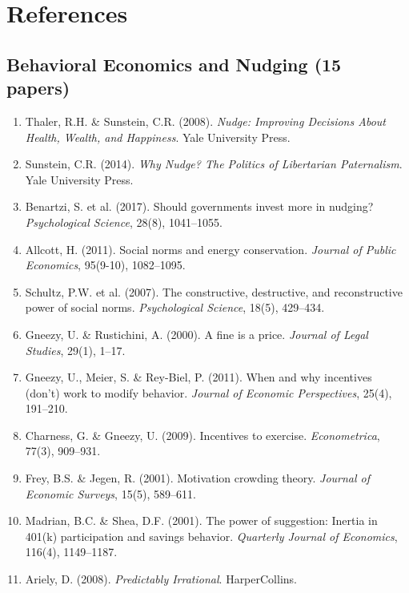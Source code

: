 \section{References}
\label{sec:references-ebf}

\subsection{Behavioral Economics and Nudging (15 papers)}

\begin{enumerate}
    \item Thaler, R.H. \& Sunstein, C.R. (2008). \textit{Nudge: Improving Decisions About Health, Wealth, and Happiness}. Yale University Press.
    \item Sunstein, C.R. (2014). \textit{Why Nudge? The Politics of Libertarian Paternalism}. Yale University Press.
    \item Benartzi, S. et al. (2017). Should governments invest more in nudging? \textit{Psychological Science}, 28(8), 1041--1055.
    \item Allcott, H. (2011). Social norms and energy conservation. \textit{Journal of Public Economics}, 95(9-10), 1082--1095.
    \item Schultz, P.W. et al. (2007). The constructive, destructive, and reconstructive power of social norms. \textit{Psychological Science}, 18(5), 429--434.
    \item Gneezy, U. \& Rustichini, A. (2000). A fine is a price. \textit{Journal of Legal Studies}, 29(1), 1--17.
    \item Gneezy, U., Meier, S. \& Rey-Biel, P. (2011). When and why incentives (don't) work to modify behavior. \textit{Journal of Economic Perspectives}, 25(4), 191--210.
    \item Charness, G. \& Gneezy, U. (2009). Incentives to exercise. \textit{Econometrica}, 77(3), 909--931.
    \item Frey, B.S. \& Jegen, R. (2001). Motivation crowding theory. \textit{Journal of Economic Surveys}, 15(5), 589--611.
    \item Madrian, B.C. \& Shea, D.F. (2001). The power of suggestion: Inertia in 401(k) participation and savings behavior. \textit{Quarterly Journal of Economics}, 116(4), 1149--1187.
    \item Ariely, D. (2008). \textit{Predictably Irrational}. HarperCollins.

\end{enumerate}
